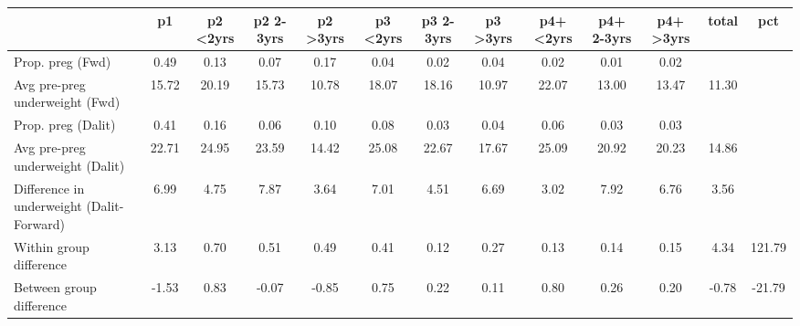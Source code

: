 \begin{tabular}{l*{12}{c}}
\toprule
            &\multicolumn{1}{c}{p1}&\multicolumn{1}{c}{p2 \textless2yrs}&\multicolumn{1}{c}{p2 2-3yrs}&\multicolumn{1}{c}{p2 \textgreater3yrs}&\multicolumn{1}{c}{p3 \textless2yrs}&\multicolumn{1}{c}{p3 2-3yrs}&\multicolumn{1}{c}{p3 \textgreater3yrs}&\multicolumn{1}{c}{p4+ \textless2yrs}&\multicolumn{1}{c}{p4+ 2-3yrs}&\multicolumn{1}{c}{p4+ \textgreater3yrs}&\multicolumn{1}{c}{total}&\multicolumn{1}{c}{pct}\\
\midrule
\midrule
Prop. preg (Fwd)&        0.49&        0.13&        0.07&        0.17&        0.04&        0.02&        0.04&        0.02&        0.01&        0.02&            &            \\
Avg pre-preg underweight (Fwd)&       15.72&       20.19&       15.73&       10.78&       18.07&       18.16&       10.97&       22.07&       13.00&       13.47&       11.30&            \\
Prop. preg (Dalit)&        0.41&        0.16&        0.06&        0.10&        0.08&        0.03&        0.04&        0.06&        0.03&        0.03&            &            \\
Avg pre-preg underweight (Dalit)&       22.71&       24.95&       23.59&       14.42&       25.08&       22.67&       17.67&       25.09&       20.92&       20.23&       14.86&            \\
Difference in underweight (Dalit-Forward)&        6.99&        4.75&        7.87&        3.64&        7.01&        4.51&        6.69&        3.02&        7.92&        6.76&        3.56&            \\
Within group difference&        3.13&        0.70&        0.51&        0.49&        0.41&        0.12&        0.27&        0.13&        0.14&        0.15&        4.34&      121.79\\
Between group difference&       -1.53&        0.83&       -0.07&       -0.85&        0.75&        0.22&        0.11&        0.80&        0.26&        0.20&       -0.78&      -21.79\\
\bottomrule
\end{tabular}
